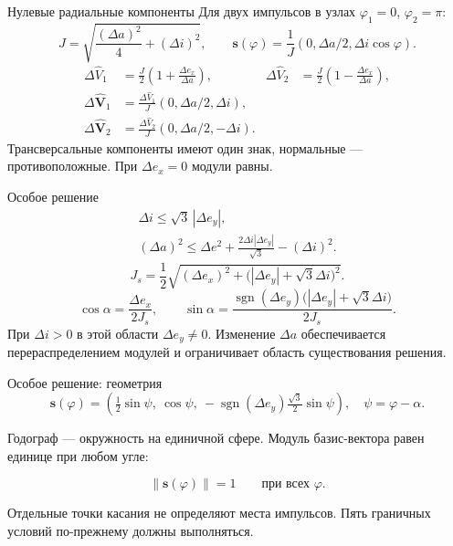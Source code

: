 \documentclass[11pt,aspectratio=169,t]{beamer}
\newcommand{\derivationmathspacing}{%
  \setlength{\abovedisplayskip}{2pt}%
  \setlength{\belowdisplayskip}{3pt}%
  \setlength{\abovedisplayshortskip}{2pt}%
  \setlength{\belowdisplayshortskip}{2pt}%
  \setlength{\jot}{2pt}}
\begin{document}
\begin{frame}{Нулевые радиальные компоненты}
\relax
\derivationmathspacing
Для двух импульсов в узлах $\varphi_1=0$, $\varphi_2=\pi$:
\[
J=\sqrt{\frac{(\Delta a)^2}{4}+(\Delta i)^2},\qquad
\boldsymbol s(\varphi)=\frac1J(0,\Delta a/2,\Delta i\cos\varphi).
\]
\[
\begin{aligned}
\Delta\widehat V_1&=\frac J2\left(1+\frac{\Delta e_x}{\Delta a}\right),&
\Delta\widehat V_2&=\frac J2\left(1-\frac{\Delta e_x}{\Delta a}\right),\\
\Delta\widehat{\boldsymbol V}_1&=
\frac{\Delta\widehat V_1}{J}(0,\Delta a/2,\Delta i),\\
\Delta\widehat{\boldsymbol V}_2&=
\frac{\Delta\widehat V_2}{J}(0,\Delta a/2,-\Delta i).
\end{aligned}
\]
\medskip
\justifying
Трансверсальные компоненты имеют один знак, нормальные ---
противоположные. При $\Delta e_x=0$ модули равны.
\end{frame}

\begin{frame}{Особое решение}
\relax
\derivationmathspacing
\[
\begin{gathered}
\Delta i\leq\sqrt3\,|\Delta e_y|,\\
(\Delta a)^2\leq\Delta e^2+
\frac{2\Delta i|\Delta e_y|}{\sqrt3}-(\Delta i)^2.
\end{gathered}
\]
\[
J_s=\frac12\sqrt{(\Delta e_x)^2+
\bigl(|\Delta e_y|+\sqrt3\Delta i\bigr)^2}.
\]
\[
\cos\alpha=\frac{\Delta e_x}{2J_s},\qquad
\sin\alpha=\frac{\operatorname{sgn}(\Delta e_y)
\bigl(|\Delta e_y|+\sqrt3\Delta i\bigr)}{2J_s}.
\]
\medskip
\justifying
При $\Delta i>0$ в этой области $\Delta e_y\ne0$.
Изменение $\Delta a$ обеспечивается перераспределением модулей
и ограничивает область существования решения.
\end{frame}

\begin{frame}{Особое решение: геометрия}
\relax
\derivationmathspacing
\[
\boldsymbol s(\varphi)=
\left(\tfrac12\sin\psi,\ \cos\psi,\
-\operatorname{sgn}(\Delta e_y)\tfrac{\sqrt3}{2}\sin\psi\right),
\quad \psi=\varphi-\alpha.
\]
\medskip
{\justifying
Годограф --- окружность на единичной сфере.
Модуль базис-вектора равен единице при любом угле:
\par}
\[
\|\boldsymbol s(\varphi)\|=1\qquad\text{при всех }\varphi.
\]
\medskip
{\justifying
Отдельные точки касания не определяют места импульсов.
Пять граничных условий по-прежнему должны выполняться.
\par}
\end{frame}
\end{document}
